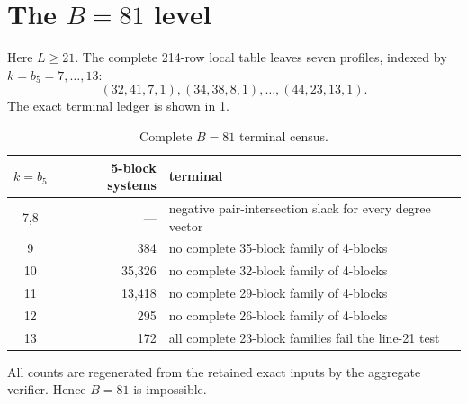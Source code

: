 \section{The $B=81$ level}

Here $L\ge21$.  The complete 214-row local table leaves seven profiles, indexed by $k=b_5=7,\ldots,13$:
\[
 (32,41,7,1), (34,38,8,1),\ldots,(44,23,13,1).
\]
The exact terminal ledger is shown in \cref{tab:B81}.

\begin{table}[ht]
\centering
\caption{Complete $B=81$ terminal census.}
\label{tab:B81}
\begin{tabular}{c r l}
\toprule
$k=b_5$ & 5-block systems & terminal \\
\midrule
7,8 & --- & negative pair-intersection slack for every degree vector \\
9 & 384 & no complete 35-block family of 4-blocks \\
10 & 35,326 & no complete 32-block family of 4-blocks \\
11 & 13,418 & no complete 29-block family of 4-blocks \\
12 & 295 & no complete 26-block family of 4-blocks \\
13 & 172 & all complete 23-block families fail the line-21 test \\
\bottomrule
\end{tabular}
\end{table}

All counts are regenerated from the retained exact inputs by the aggregate verifier.  Hence $B=81$ is impossible.

